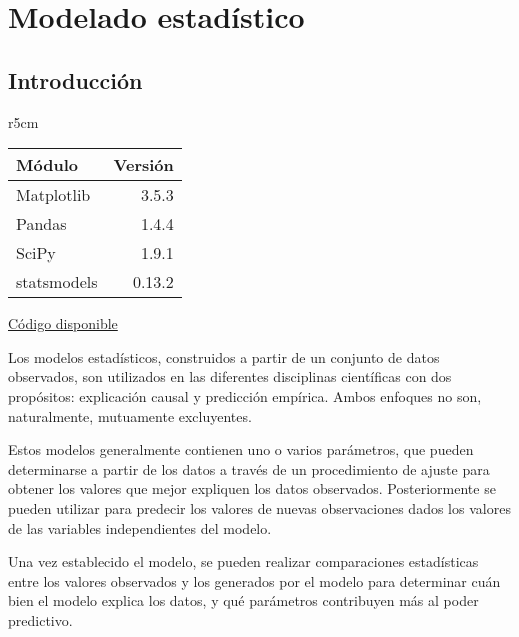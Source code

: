 

 \chapter{Modelado estadístico} \label{ch:modest}   

 \section{Introducción}

\begin{wraptable}{r}{5cm}
\begin{modulesinfo}
\begin{center}
{\small
    \begin{tabular}{l r}
        \toprule
        \textbf{Módulo} & \textbf{Versión} \\
        \midrule
        Matplotlib & 3.5.3 \\
        Pandas & 1.4.4 \\
        SciPy & 1.9.1 \\
        statsmodels & 0.13.2 \\
        \bottomrule
    \end{tabular}
    \vspace{0.75em}
    
    \href{https://github.com/facundobatista/libro-pyciencia/tree/master/código/modelado_estadistico/}{Código disponible}
}
\end{center}
\end{modulesinfo}
\end{wraptable}

Los modelos estadísticos, construidos a partir de un conjunto de datos observados, son utilizados en las diferentes disciplinas científicas con dos propósitos: explicación causal y predicción empírica. Ambos enfoques no son, naturalmente, mutuamente excluyentes.

Estos modelos generalmente contienen uno o varios parámetros, que pueden determinarse a partir de los datos a través de un procedimiento de ajuste para obtener los valores que mejor expliquen los datos observados. Posteriormente se pueden utilizar para predecir los valores de nuevas observaciones dados los valores de las variables independientes del modelo.

Una vez establecido el modelo, se pueden realizar comparaciones estadísticas entre los valores observados y los generados por el modelo para determinar cuán bien el modelo explica los datos, y qué parámetros contribuyen más al poder predictivo.

